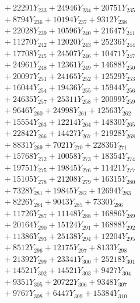 \documentclass[a4paper,10pt]{article}
\begin{document}
{\begin{align}
&\;  + 22291 Y_{233} + 24946 Y_{234} + 20751 Y_{235} \\[0.3ex]
&\;  + 8794 Y_{236} + 10194 Y_{237} + 9312 Y_{238} \\[0.5ex]\allowbreak
&\;  + 22028 Y_{239} + 10596 Y_{240} + 21647 Y_{241} \\[0.3ex]
&\;  + 11270 Y_{242} + 12020 Y_{243} + 25236 Y_{244} \\[0.3ex]
&\;  + 17708 Y_{245} + 24507 Y_{246} + 10471 Y_{247} \\[0.3ex]
&\;  + 24961 Y_{248} + 12361 Y_{249} + 14688 Y_{250} \\[0.3ex]
&\;  + 20097 Y_{251} + 24165 Y_{252} + 12529 Y_{253} \\[0.3ex]
&\;  + 16044 Y_{254} + 19436 Y_{255} + 15944 Y_{256} \\[0.3ex]
&\;  + 24635 Y_{257} + 25311 Y_{258} + 20099 Y_{259} \\[0.3ex]
&\;  + 9646 Y_{260} + 24998 Y_{261} + 12563 Y_{262} \\[0.3ex]
&\;  + 15554 Y_{263} + 12214 Y_{264} + 14830 Y_{265} \\[0.3ex]
&\;  + 22842 Y_{266} + 14427 Y_{267} + 21928 Y_{268} \\[0.5ex]\allowbreak
&\;  + 8831 Y_{269} + 7021 Y_{270} + 22836 Y_{271} \\[0.3ex]
&\;  + 15768 Y_{272} + 10058 Y_{273} + 18354 Y_{274} \\[0.3ex]
&\;  + 19751 Y_{275} + 19845 Y_{276} + 11421 Y_{277} \\[0.3ex]
&\;  + 15105 Y_{278} + 21208 Y_{279} + 16315 Y_{280} \\[0.3ex]
&\;  + 7328 Y_{281} + 19845 Y_{282} + 12694 Y_{283} \\[0.3ex]
&\;  + 8226 Y_{284} + 9043 Y_{285} + 7330 Y_{286} \\[0.3ex]
&\;  + 11726 Y_{287} + 11148 Y_{288} + 16886 Y_{289} \\[0.3ex]
&\;  + 20164 Y_{290} + 15124 Y_{291} + 16888 Y_{292} \\[0.3ex]
&\;  + 11386 Y_{293} + 25138 Y_{294} + 12204 Y_{295} \\[0.3ex]
&\;  + 8512 Y_{296} + 12175 Y_{297} + 8133 Y_{298} \\[0.5ex]\allowbreak
&\;  + 21392 Y_{299} + 23341 Y_{300} + 25218 Y_{301} \\[0.3ex]
&\;  + 14521 Y_{302} + 14521 Y_{303} + 9427 Y_{304} \\[0.3ex]
&\;  + 9351 Y_{305} + 20722 Y_{306} + 9348 Y_{307} \\[0.3ex]
&\;  + 9767 Y_{308} + 6447 Y_{309} + 15384 Y_{310} \\[0.3ex]

\end{align}}
\end{document}

